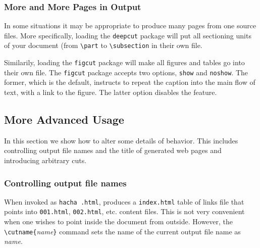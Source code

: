 \subsubsection{More and More Pages in Output}
%
In some situations it may be appropriate to produce many
pages from one source files.
More specifically, loading the \texttt{deepcut} package will put
all sectioning units of your document (from \verb+\part+ to
\verb+\subsection+ in their own file.

Similarily, loading the \texttt{figcut} package will make all figures
and tables go into their own file.
The \texttt{figcut} package accepts two options, \texttt{show} and
\texttt{noshow}. The former, which is the default, instructs \hevea{}
to repeat the caption into the main flow of text, with a link to the figure.
The latter option disables the feature.


\subsection{More Advanced Usage}
In this section we show how to alter some details of \hacha{}
behavior.
This includes controlling output file names and the title of generated
web pages and introducing arbitrary cuts.

\subsubsection{Controlling\label{cutname} output file names}
%
%
When invoked as \texttt{hacha .html},
\hacha{} produces a \texttt{index.html} table of links file that
points into \texttt{001.html},
\texttt{002.html}, etc. content files.
This is not very convenient when one wishes to point inside the
document from outside.
However, the \verb+\cutname{+\textit{name}\verb+}+ command
sets the name of  the current output file name as \textit{name}.

